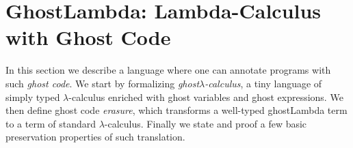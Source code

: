 \section{GhostLambda: Lambda-Calculus with Ghost Code}
%
% 
%   
 
In this section we describe a language where one can annotate programs with such \textit{ghost code}.
We start by formalizing \textit{ghost}$\lambda$\textit{-calculus}, a tiny language of simply typed $\lambda$-calculus enriched with ghost variables and ghost expressions.
We then define ghost code \textit{erasure}, which transforms a well-typed ghostLambda term  to a term of standard  $\lambda$-calculus.
Finally we state and proof a few basic preservation properties of such translation.

